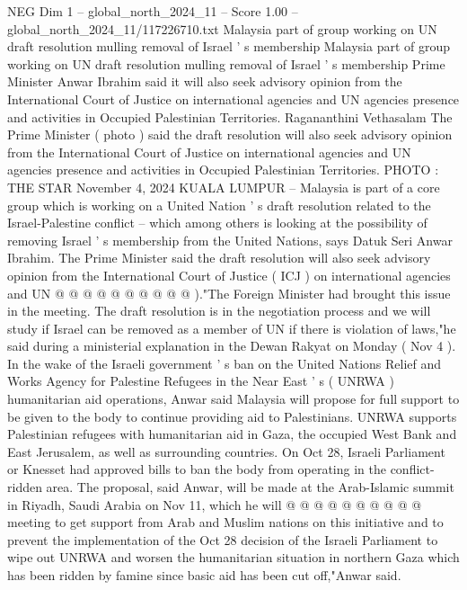 \begin{textsample}{NEG Dim 1 – global\_north\_2024\_11 – Score 1.00 – global\_north\_2024\_11/117226710.txt}  \label{ex:f1_neg_226}
Malaysia part of group working on UN draft resolution mulling removal of Israel ' s membership Malaysia part of group working on UN draft resolution mulling removal of Israel ' s membership Prime Minister Anwar Ibrahim said it will also seek advisory opinion from the International Court of Justice on international agencies and UN agencies presence and activities in Occupied Palestinian Territories.
Ragananthini Vethasalam The Prime Minister ( photo ) said the draft resolution will also seek advisory opinion from the International Court of Justice on international agencies and UN agencies presence and activities in Occupied Palestinian Territories.
PHOTO : THE STAR November 4, 2024 KUALA LUMPUR -- Malaysia is part of a core group which is working on a United Nation ' s draft resolution related to the Israel-Palestine conflict -- which among others is looking at the possibility of removing Israel ' s membership from the United Nations, says Datuk Seri Anwar Ibrahim.
The Prime Minister said the draft resolution will also seek advisory opinion from the International Court of Justice ( ICJ ) on international agencies and UN @ @ @ @ @ @ @ @ @ @ )."The Foreign Minister had brought this issue in the meeting.
The draft resolution is in the negotiation process and we will study if Israel can be removed as a member of UN if there is violation of laws,"he said during a ministerial explanation in the Dewan Rakyat on Monday ( Nov 4 ).
In the wake of the Israeli government ' s ban on the United Nations Relief and Works Agency for Palestine Refugees in the Near East ' s ( UNRWA ) humanitarian aid operations, Anwar said Malaysia will propose for full support to be given to the body to continue providing aid to Palestinians.
UNRWA supports Palestinian refugees with humanitarian aid in Gaza, the occupied West Bank and East Jerusalem, as well as surrounding countries.
On Oct 28, Israeli Parliament or Knesset had approved bills to ban the body from operating in the conflict-ridden area.
The proposal, said Anwar, will be made at the Arab-Islamic summit in Riyadh, Saudi Arabia on Nov 11, which he will @ @ @ @ @ @ @ @ @ @ meeting to get support from Arab and Muslim nations on this initiative and to prevent the implementation of the Oct 28 decision of the Israeli Parliament to wipe out UNRWA and worsen the humanitarian situation in northern Gaza which has been ridden by famine since basic aid has been cut off,"Anwar said.

\end{textsample}
